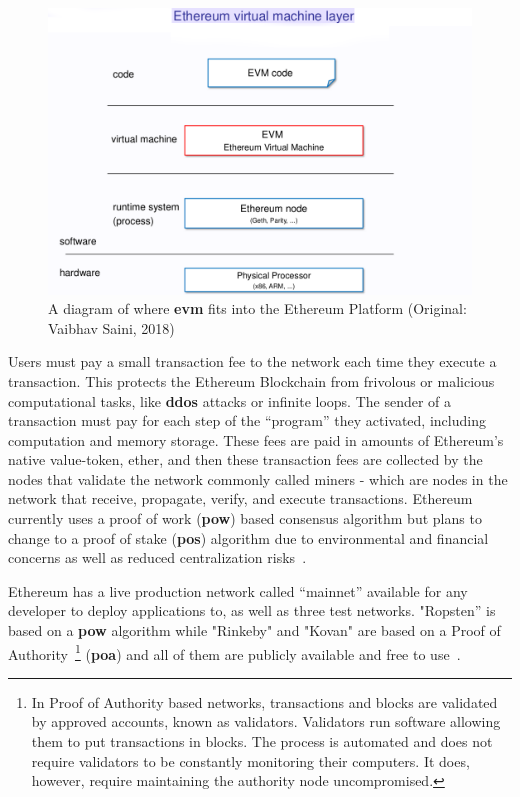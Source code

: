 \begin{figure}[h]
  \centering
  \includegraphics[width=1\linewidth]{imgs/ethereumVirtualMachine.png}
  \caption{\label{fig:evm} A diagram of where \textbf{evm} fits into the
  Ethereum Platform (Original: Vaibhav Saini, 2018)}
\end{figure}

Users must pay a small transaction fee to the network each time they execute a
transaction. This protects the Ethereum Blockchain from frivolous or malicious
computational tasks, like \textbf{ddos} attacks or infinite loops. The sender
of a transaction must pay for each step of the “program” they activated,
including computation and memory storage. These fees are paid in amounts of
Ethereum’s native value-token, ether, and then these transaction fees are
collected by the nodes that validate the network commonly called miners - which
are nodes in the network that receive, propagate, verify, and execute
transactions. Ethereum currently uses a proof of work (\textbf{pow}) based
consensus algorithm but plans to change to a proof of stake (\textbf{pos})
algorithm due to environmental and financial concerns as well as reduced
centralization risks~\cite{EthereumDocs2018,EthereumPOSFAQ2018}.

Ethereum has a live production network called “mainnet” available for any
developer to deploy applications to, as well as three test networks. "Ropsten”
is based on a \textbf{pow} algorithm while "Rinkeby" and "Kovan" are based on a
Proof of Authority~\footnote{In Proof of Authority based networks, transactions
and blocks are validated by approved accounts, known as validators. Validators
run software allowing them to put transactions in blocks. The process is
automated and does not require validators to be constantly monitoring their
computers. It does, however, require maintaining the authority node
uncompromised.} (\textbf{poa}) and all of them are publicly available and free
to use~\cite{Barclay2017,EthereumTestNetworks2018}.

